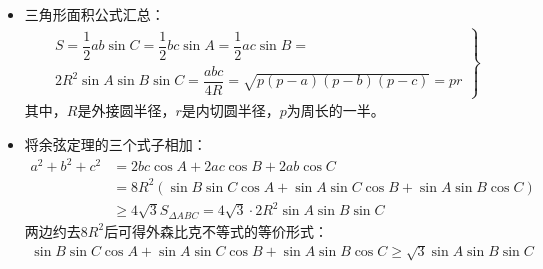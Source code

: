 \begin{itemize}[leftmargin=\inteval{\myitemleftmargin}pt,itemsep=
   \inteval{\myitemitempsep}pt,topsep=\inteval{\myitemtopsep}pt]
\item 三角形面积公式汇总：
\begin{gather}\label{三角形面积公式汇总}
    \left.    
    \begin{gathered}
        S=\dfrac{1}{2}ab\sin C=\dfrac{1}{2}bc\sin A=\dfrac{1}{2}ac\sin B=\\ 
        2R^2\sin A\sin B\sin C=\dfrac{abc}{4R}=\sqrt{p(p-a)(p-b)(p-c)}=pr
    \end{gathered} \right\}
\end{gather}
其中，$ R $是外接圆半径，$ r $是内切圆半径，$ p $为周长的一半。

\item 将余弦定理的三个式子相加：
\begin{align*}
    a^2+b^2+c^2 &=2bc\cos A+2ac\cos B+2ab\cos C \\
    &=8R^2(\sin B\sin C\cos A+\sin A\sin C\cos B+\sin A\sin B\cos C) \\
    &\geq 4\sqrt{3}S_{\Delta ABC}=4\sqrt{3}\cdot 2R^2\sin A\sin B\sin C
\end{align*}
两边约去$ 8R^2 $后可得外森比克不等式的等价形式：
\begin{gather*}
    \sin B\sin C\cos A+\sin A\sin C\cos B+\sin A\sin B\cos C
    \geq \sqrt{3} \sin A\sin B\sin C
\end{gather*}


\end{itemize}
